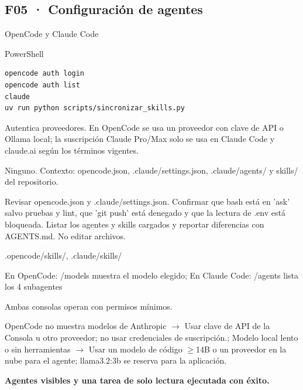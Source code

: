\subsection{F05 · Configuración de agentes}\label{fase:F05}
\begin{description}[leftmargin=3.2cm,style=nextline]
\item[1. Herramienta] OpenCode y Claude Code
\item[2. Terminal] PowerShell
\item[3. Comandos] \leavevmode
\begin{lstlisting}[style=ps]
opencode auth login
opencode auth list
claude
uv run python scripts/sincronizar_skills.py
\end{lstlisting}
\item[4. Explicación] Autentica proveedores. En OpenCode se usa un proveedor con clave de API o Ollama local; la suscripción Claude Pro/Max solo se usa en Claude Code y claude.ai según los términos vigentes.
\item[5. Agente] Ninguno. Contexto: opencode.json, .claude/settings.json, .claude/agents/ y skills/ del repositorio.
\begin{promptbox}Revisar opencode.json y .claude/settings.json. Confirmar que bash está en 'ask' salvo pruebas y lint, que 'git push' está denegado y que la lectura de .env está bloqueada. Listar los agentes y skills cargados y reportar diferencias con AGENTS.md. No editar archivos.\end{promptbox}
\item[6. Archivos] .opencode/skills/, .claude/skills/
\item[7. Pruebas] En OpenCode: /models muestra el modelo elegido; En Claude Code: /agents lista los 4 subagentes
\item[8. Resultado] Ambas consolas operan con permisos mínimos.
\item[9. Errores] OpenCode no muestra modelos de Anthropic $\rightarrow$ Usar clave de API de la Consola u otro proveedor; no usar credenciales de suscripción.; Modelo local lento o sin herramientas $\rightarrow$ Usar un modelo de código $\geq$14B o un proveedor en la nube para el agente; llama3.2:3b se reserva para la aplicación.
\item[10. Condición] \textbf{Agentes visibles y una tarea de solo lectura ejecutada con éxito.}
\end{description}

